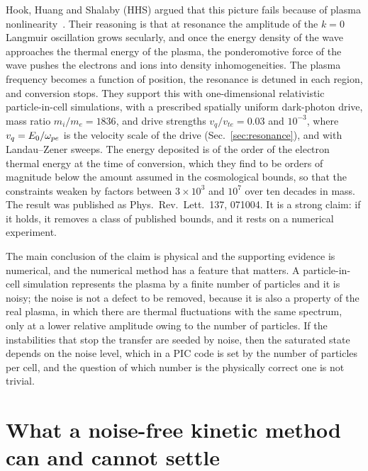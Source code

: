 Hook, Huang and Shalaby (HHS) argued that this picture fails because of plasma nonlinearity~\citep{HHS2026}. Their reasoning is that at resonance the amplitude of the $k=0$ Langmuir oscillation grows secularly, and once the energy density of the wave approaches the thermal energy of the plasma, the ponderomotive force of the wave pushes the electrons and ions into density inhomogeneities. The plasma frequency becomes a function of position, the resonance is detuned in each region, and conversion stops. They support this with one-dimensional relativistic particle-in-cell simulations, with a prescribed spatially uniform dark-photon drive, mass ratio $m_i/m_e=1836$, and drive strengths $v_q/v_{te}=0.03$ and $10^{-3}$, where $v_q=E_0/\omega_{pe}$ is the velocity scale of the drive (Sec.~\ref{sec:resonance}), and with Landau--Zener sweeps. The energy deposited is of the order of the electron thermal energy at the time of conversion, which they find to be orders of magnitude below the amount assumed in the cosmological bounds, so that the constraints weaken by factors between $3\times10^3$ and $10^7$ over ten decades in mass. The result was published as Phys.\ Rev.\ Lett.\ 137, 071004. It is a strong claim: if it holds, it removes a class of published bounds, and it rests on a numerical experiment.

The main conclusion of the claim is physical and the supporting evidence is numerical, and the numerical method has a feature that matters. A particle-in-cell simulation represents the plasma by a finite number of particles and it is noisy; the noise is not a defect to be removed, because it is also a property of the real plasma, in which there are thermal fluctuations with the same spectrum, only at a lower relative amplitude owing to the number of particles. If the instabilities that stop the transfer are seeded by noise, then the saturated state depends on the noise level, which in a PIC code is set by the number of particles per cell, and the question of which number is the physically correct one is not trivial.

\section{What a noise-free kinetic method can and cannot settle}

